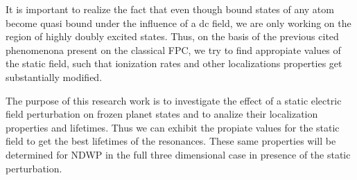 It is important to realize the fact that even though bound states of any atom become quasi bound under the influence of a dc field, we are only working on the region of highly doubly excited states. Thus, on the basis of the previous cited phenomenona present on the classical FPC, we try to find appropiate values of the static field, such that ionization rates and other localizations properties get substantially modified.

The purpose of this research work is to investigate the effect of a static electric field perturbation on frozen planet states and to analize their localization properties and lifetimes. Thus we can exhibit the propiate values for the static field to get the best lifetimes of the resonances. These same properties will be determined for NDWP in the full three dimensional case in presence of the static perturbation.